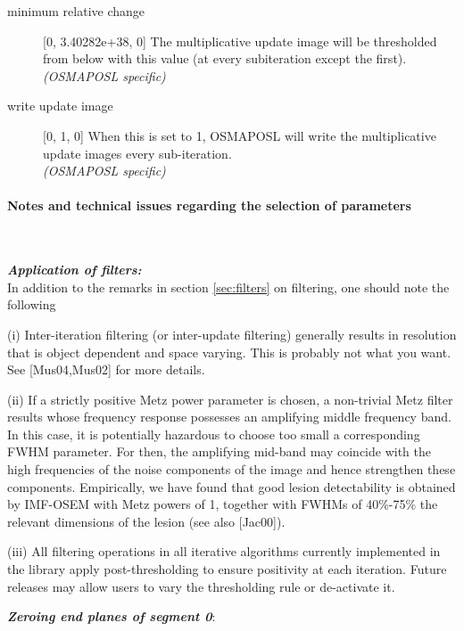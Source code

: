 \documentclass{article}
\newcommand{\subsubsubsection}[1]{\paragraph{#1}\mbox{} \\}
\begin{document}
\begin{description}
\item[minimum relative change] [0, 3.40282e+38, 0{]}
The multiplicative update image will be thresholded from below 
with this value (at every subiteration except the first).\\
\textit{(OSMAPOSL specific)}


\item[write update image] [0, 1, 0{]}
When this is set to 1, OSMAPOSL will write the multiplicative 
update images every sub-iteration.\\
\textit{(OSMAPOSL specific)}

\end{description}


{
\subsubsubsection{
Notes and technical issues regarding the selection of parameters}
}
\label{sec:OSMAPOSLtechnotes}

\textbf{\textit{Application of filters:}} \\
In addition to the remarks in section \ref{sec:filters} on filtering, 
one should 
note the following


(i) Inter-iteration filtering (or inter-update filtering) generally 
results in resolution that is object dependent and space varying. 
This is probably not what you want. See [Mus04,Mus02] for more 
details.



(ii) If a strictly positive Metz power parameter is chosen, a 
non-trivial Metz filter results whose frequency response possesses 
an amplifying middle frequency band. In this case, it is potentially 
hazardous to choose too small a corresponding FWHM parameter. 
For then, the amplifying mid-band may coincide with the high 
frequencies of the noise components of the image and hence strengthen 
these components. Empirically, we have found that good lesion 
detectability is obtained by IMF-OSEM with Metz powers of 1, 
together with FWHMs of 40\%-75\% the relevant dimensions of the 
lesion (see also [Jac00]).



(iii) All filtering operations in all iterative algorithms currently 
implemented in the library apply post-thresholding 
to ensure positivity at each iteration. Future 
releases may allow users to vary the thresholding rule or de-activate 
it.


\textbf{\textit{Zeroing end planes of segment 0}}: 
\end{document}

